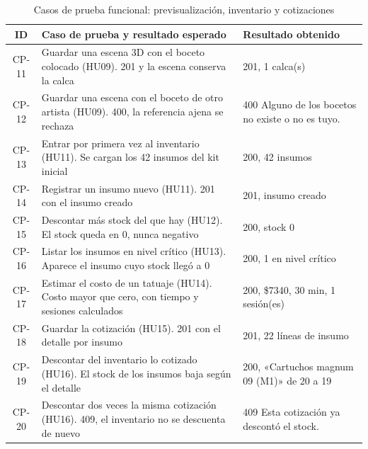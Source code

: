 \begin{table}[H]
  \centering
  \caption{Casos de prueba funcional: previsualización, inventario y cotizaciones}
  \label{tab:casosinv}
  \renewcommand{\arraystretch}{1.2}
  \footnotesize
  \begin{tabular}{|c|p{5.9cm}|p{5.3cm}|}
    \hline
    \textbf{ID} & \textbf{Caso de prueba y resultado esperado} & \textbf{Resultado obtenido} \\
    \hline
    CP-11 & Guardar una escena 3D con el boceto colocado (HU09). 201 y la escena conserva la calca & 201, 1 calca(s) \\ \hline
    CP-12 & Guardar una escena con el boceto de otro artista (HU09). 400, la referencia ajena se rechaza & 400 Alguno de los bocetos no existe o no es tuyo. \\ \hline
    CP-13 & Entrar por primera vez al inventario (HU11). Se cargan los 42 insumos del kit inicial & 200, 42 insumos \\ \hline
    CP-14 & Registrar un insumo nuevo (HU11). 201 con el insumo creado & 201, insumo creado \\ \hline
    CP-15 & Descontar más stock del que hay (HU12). El stock queda en 0, nunca negativo & 200, stock 0 \\ \hline
    CP-16 & Listar los insumos en nivel crítico (HU13). Aparece el insumo cuyo stock llegó a 0 & 200, 1 en nivel crítico \\ \hline
    CP-17 & Estimar el costo de un tatuaje (HU14). Costo mayor que cero, con tiempo y sesiones calculados & 200, \$7340, 30 min, 1 sesión(es) \\ \hline
    CP-18 & Guardar la cotización (HU15). 201 con el detalle por insumo & 201, 22 líneas de insumo \\ \hline
    CP-19 & Descontar del inventario lo cotizado (HU16). El stock de los insumos baja según el detalle & 200, «Cartuchos magnum 09 (M1)» de 20 a 19 \\ \hline
    CP-20 & Descontar dos veces la misma cotización (HU16). 409, el inventario no se descuenta de nuevo & 409 Esta cotización ya descontó el stock. \\ \hline
  \end{tabular}
\end{table}

